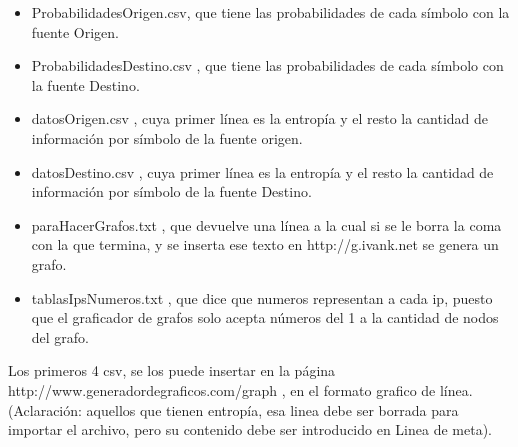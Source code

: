 \begin{itemize}
	\item ProbabilidadesOrigen.csv, que tiene las probabilidades de cada símbolo con la fuente Origen.
	\item ProbabilidadesDestino.csv , que tiene las probabilidades de cada símbolo con la fuente Destino. 
	\item datosOrigen.csv , cuya primer línea es la entropía y el resto la cantidad de información por símbolo de la fuente origen.
	\item datosDestino.csv , cuya primer línea es la entropía y el resto la cantidad de información por símbolo de la fuente Destino.
	\item paraHacerGrafos.txt , que devuelve una línea a la cual si se le borra la coma con la que termina, y se inserta ese texto en http://g.ivank.net se genera un grafo.
	\item tablasIpsNumeros.txt , que dice que numeros representan a cada ip, puesto que el graficador de grafos solo acepta números del 1 a la cantidad de nodos del grafo.
\end{itemize}

Los primeros 4 csv, se los puede insertar en la página http://www.generadordegraficos.com/graph , en el formato grafico de línea. (Aclaración: aquellos que tienen entropía, esa linea debe ser borrada para importar el archivo, pero su contenido debe ser introducido en Linea de meta).